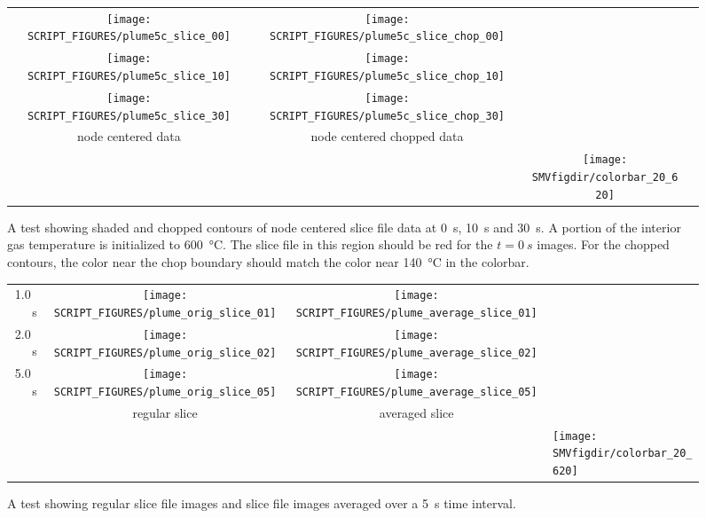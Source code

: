 \documentclass[11pt,twoside]{book}
\begin{document}
\begin{figure}[bph]
\begin{center}
\begin{tabular}{cccp{1.0in}}
 \texttt{[image: SCRIPT\_FIGURES/plume5c\_slice\_00]}&
 \texttt{[image: SCRIPT\_FIGURES/plume5c\_slice\_chop\_00]}\\

 \texttt{[image: SCRIPT\_FIGURES/plume5c\_slice\_10]}&
 \texttt{[image: SCRIPT\_FIGURES/plume5c\_slice\_chop\_10]}\\

 \texttt{[image: SCRIPT\_FIGURES/plume5c\_slice\_30]}&
 \texttt{[image: SCRIPT\_FIGURES/plume5c\_slice\_chop\_30]}\\

 node centered data&node centered chopped data\\
&&\raisebox{0.5in}[0pt]{\texttt{[image: \\SMVfigdir/colorbar\_20\_620]}}\\
 \end{tabular}
\end{center}
 \caption[A test showing shaded and chopped contours of node centered slice
 file data]{A test showing shaded and chopped contours of node centered slice
 file data at \SI{0}{s}, \SI{10}{s} and \SI{30}{s}.  A portion of the interior
 gas temperature is initialized to \SI{600}{\degreeCelsius}.  The slice file
 in this region should be red for the $t=\SI{0}{s}$ images.  For the chopped
 contours, the color near the chop boundary should match the color near
 \SI{140}{\degreeCelsius} in the colorbar.}
\label{fignodeslicetest}%
\end{figure}


\begin{figure}[bph]
\begin{center}
\begin{tabular}{rccp{1.0in}}
1.0~s&
 \texttt{[image: SCRIPT\_FIGURES/plume\_orig\_slice\_01]}&
 \texttt{[image: SCRIPT\_FIGURES/plume\_average\_slice\_01]}\\

2.0~s&
 \texttt{[image: SCRIPT\_FIGURES/plume\_orig\_slice\_02]}&
 \texttt{[image: SCRIPT\_FIGURES/plume\_average\_slice\_02]}\\

 5.0~s&
\texttt{[image: SCRIPT\_FIGURES/plume\_orig\_slice\_05]}&
 \texttt{[image: SCRIPT\_FIGURES/plume\_average\_slice\_05]}\\

& regular slice&averaged slice\\
&&&\raisebox{0.5in}[0pt]{\texttt{[image: \\SMVfigdir/colorbar\_20\_620]}}\\
 \end{tabular}
\end{center}
 \caption[A test showing regular and averaged slice file data]{A test showing regular slice file images and slice file images averaged over a 5~s time interval.}
\label{figsliceaveragetest}%
\end{figure}
\end{document}
